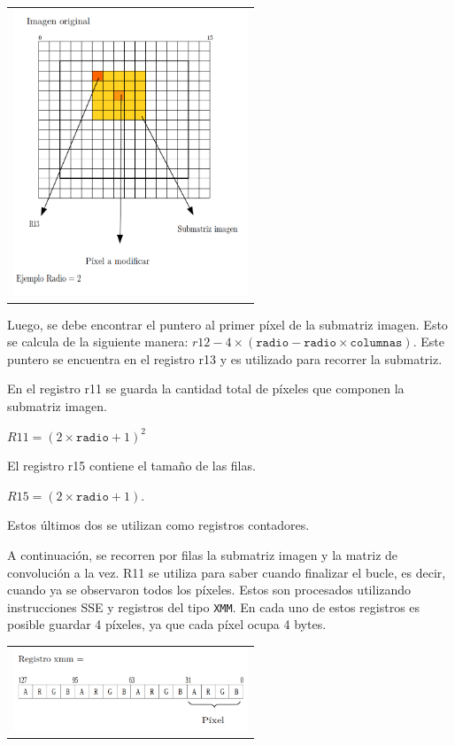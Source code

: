         {\centering \begin{tabular}{c}
          \includegraphics[width=7cm]{./imagenes/5.png} \\
        \end{tabular}}

        Luego, se debe encontrar el puntero al primer píxel de la submatriz imagen. Esto se calcula de la siguiente manera: $r12 - 4 \times (\mathtt{radio} - \mathtt{radio} \times \mathtt{columnas})$. Este puntero se encuentra en el registro r13 y es utilizado para recorrer la submatriz. 

        En el registro r11 se guarda la cantidad total de píxeles que componen la submatriz imagen. 

              $R11 = (2 \times \mathtt{radio} + 1)^{2}$  
        
        El registro r15 contiene el tamaño de las filas.
        
              $R15 =(2 \times \mathtt{radio}  + 1)$.

        Estos últimos dos se utilizan como registros contadores.

        A continuación, se recorren por filas la submatriz imagen y la matriz de convolución a la vez. R11 se utiliza para saber cuando finalizar el bucle, es decir, cuando ya se observaron todos los píxeles. Estos son procesados utilizando instrucciones SSE y registros del tipo \texttt{XMM}. En cada uno de estos registros es posible guardar 4 píxeles, ya que cada píxel ocupa 4 bytes. 

        {\centering \begin{tabular}{c}
          \includegraphics[width=7cm]{./imagenes/6.png} \\
        \end{tabular}}
  

